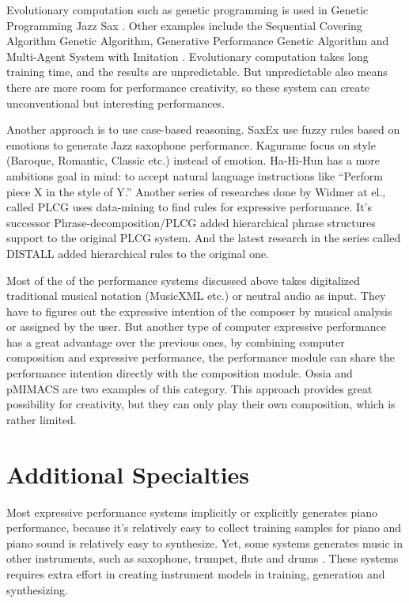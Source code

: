 Evolutionary computation such as genetic programming is used in Genetic Programming Jazz Sax \cite{88}. Other examples include the Sequential Covering Algorithm Genetic Algorithm\cite{59}, Generative Performance Genetic Algorithm \cite{89} and Multi-Agent System with Imitation \cite{60, 93}. Evolutionary computation takes long training time, and the results are unpredictable. But unpredictable also means there are more room for performance creativity, so these system can create unconventional but interesting performances.

Another approach is to use case-based reasoning. SaxEx\cite{40,41,42} use fuzzy rules based on emotions to generate Jazz saxophone performance. Kagurame \cite{43,44} focus on style (Baroque, Romantic, Classic etc.) instead of emotion. Ha-Hi-Hun \cite{45} has a more ambitions goal in mind: to accept natural language instructions like \enquote{Perform piece X in the style of Y.} Another series of researches done by Widmer at el., called PLCG \cite{46, 47, 48} uses data-mining to find rules for expressive performance. It's successor Phrase-decomposition/PLCG \cite{49} added hierarchical phrase structures support to the original PLCG system. And the latest research in the series called DISTALL \cite{50, 51} added hierarchical rules to the original one.

Most of the of the performance systems discussed above takes digitalized traditional musical notation (MusicXML etc.) or neutral audio as input. They have to figures out the expressive intention of the composer by musical analysis or assigned by the user. But another type of computer expressive performance has a great advantage over the previous ones, by combining computer composition and expressive performance, the performance module can share the performance intention directly with the composition module. Ossia \cite{61} and pMIMACS \cite{pmimacs} are two examples of this category.  This approach provides great possibility for creativity, but they can only play their own composition, which is rather limited.

\section{Additional Specialties}

Most expressive performance systems implicitly or explicitly generates piano performance, because it's relatively easy to collect training samples for piano and piano sound is relatively easy to synthesize. Yet, some systems generates music in other instruments, such as saxophone\cite{40, 41, 42}, trumpet\cite{24, 25}, flute \cite{39} and drums \cite{56}. These systems requires extra effort in creating instrument models in training, generation and synthesizing. 

